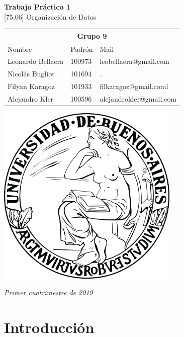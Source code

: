 \documentclass[titlepage,a4paper]{article}
\begin{document}
\begin{titlepage} %
    \centering
    \vfill
    \Huge \textbf{Trabajo Práctico 1} \\
    
    \vskip1cm
    \Huge [75.06] Organización de Datos\\
    \vskip2cm
    \begin{table}[htbp]
	\begin{center}
	\begin{adjustbox}{max width=\textwidth}
	\begin{tabular}{|l|l|l|}
	\hline
    \multicolumn{3}{|c|}{Grupo 9} \\ \hline
	Nombre & Padrón & Mail \\ \hline 
    Leonardo Bellaera & 100973 & leobellaera@gmail.com \\ \hline 
    Nicolás Bugliot & 101694  & .. \\ \hline
    Filyan Karagoz &  101933 & filkaragoz@gmail.coml \\ \hline
    Alejandro Kler & 100596 & alejandrokler@gmail.com \\ \hline
    \end{tabular}
    \end{adjustbox}
    \vskip 2cm
    \includegraphics[width=8.7cm, height=8.7cm]{UBA.png}
	\label{tabla:sencilla}
	\end{center}
	\end{table}
	\vskip1cm
	\Large \textit{Primer cuatrimestre de 2019}

    \vfill
\end{titlepage}
\tableofcontents %
\newpage

\section{Introducción}\label{sec:intro}
\end{document}
